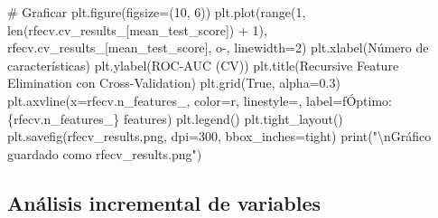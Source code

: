 \documentclass[
  doc,
  floatsintext,
  longtable,
  a4paper,
  nolmodern,
  notxfonts,
  notimes,
  12pt,
  colorlinks=true,linkcolor=blue,citecolor=blue,urlcolor=blue]{apa7}
\newenvironment{Shaded}{\begin{snugshade}}{\end{snugshade}}
\newcommand{\BuiltInTok}[1]{\textcolor[rgb]{0.00,0.23,0.31}{#1}}
\newcommand{\CharTok}[1]{\textcolor[rgb]{0.13,0.47,0.30}{#1}}
\newcommand{\CommentTok}[1]{\textcolor[rgb]{0.37,0.37,0.37}{#1}}
\newcommand{\DecValTok}[1]{\textcolor[rgb]{0.68,0.00,0.00}{#1}}
\newcommand{\FloatTok}[1]{\textcolor[rgb]{0.68,0.00,0.00}{#1}}
\newcommand{\NormalTok}[1]{\textcolor[rgb]{0.00,0.23,0.31}{#1}}
\newcommand{\OperatorTok}[1]{\textcolor[rgb]{0.37,0.37,0.37}{#1}}
\newcommand{\SpecialCharTok}[1]{\textcolor[rgb]{0.37,0.37,0.37}{#1}}
\newcommand{\SpecialStringTok}[1]{\textcolor[rgb]{0.13,0.47,0.30}{#1}}
\newcommand{\StringTok}[1]{\textcolor[rgb]{0.13,0.47,0.30}{#1}}
\newcommand{\VariableTok}[1]{\textcolor[rgb]{0.07,0.07,0.07}{#1}}
\begin{document}
\begin{Shaded}
\begin{Highlighting}[]
\CommentTok{\# Graficar}
\NormalTok{plt.figure(figsize}\OperatorTok{=}\NormalTok{(}\DecValTok{10}\NormalTok{, }\DecValTok{6}\NormalTok{))}
\NormalTok{plt.plot(}\BuiltInTok{range}\NormalTok{(}\DecValTok{1}\NormalTok{, }\BuiltInTok{len}\NormalTok{(rfecv.cv\_results\_[}\StringTok{\textquotesingle{}mean\_test\_score\textquotesingle{}}\NormalTok{]) }\OperatorTok{+} \DecValTok{1}\NormalTok{),}
\NormalTok{         rfecv.cv\_results\_[}\StringTok{\textquotesingle{}mean\_test\_score\textquotesingle{}}\NormalTok{], }\StringTok{\textquotesingle{}o{-}\textquotesingle{}}\NormalTok{, linewidth}\OperatorTok{=}\DecValTok{2}\NormalTok{)}
\NormalTok{plt.xlabel(}\StringTok{\textquotesingle{}Número de características\textquotesingle{}}\NormalTok{)}
\NormalTok{plt.ylabel(}\StringTok{\textquotesingle{}ROC{-}AUC (CV)\textquotesingle{}}\NormalTok{)}
\NormalTok{plt.title(}\StringTok{\textquotesingle{}Recursive Feature Elimination con Cross{-}Validation\textquotesingle{}}\NormalTok{)}
\NormalTok{plt.grid(}\VariableTok{True}\NormalTok{, alpha}\OperatorTok{=}\FloatTok{0.3}\NormalTok{)}
\NormalTok{plt.axvline(x}\OperatorTok{=}\NormalTok{rfecv.n\_features\_, color}\OperatorTok{=}\StringTok{\textquotesingle{}r\textquotesingle{}}\NormalTok{, linestyle}\OperatorTok{=}\StringTok{\textquotesingle{}{-}{-}\textquotesingle{}}\NormalTok{,}
\NormalTok{            label}\OperatorTok{=}\SpecialStringTok{f\textquotesingle{}Óptimo: }\SpecialCharTok{\{}\NormalTok{rfecv}\SpecialCharTok{.}\NormalTok{n\_features\_}\SpecialCharTok{\}}\SpecialStringTok{ features\textquotesingle{}}\NormalTok{)}
\NormalTok{plt.legend()}
\NormalTok{plt.tight\_layout()}
\NormalTok{plt.savefig(}\StringTok{\textquotesingle{}rfecv\_results.png\textquotesingle{}}\NormalTok{, dpi}\OperatorTok{=}\DecValTok{300}\NormalTok{, bbox\_inches}\OperatorTok{=}\StringTok{\textquotesingle{}tight\textquotesingle{}}\NormalTok{)}
\BuiltInTok{print}\NormalTok{(}\StringTok{"}\CharTok{\textbackslash{}n}\StringTok{Gráfico guardado como \textquotesingle{}rfecv\_results.png\textquotesingle{}"}\NormalTok{)}
\end{Highlighting}
\end{Shaded}

\subsection{Análisis incremental de
variables}\label{anuxe1lisis-incremental-de-variables}
\end{document}
